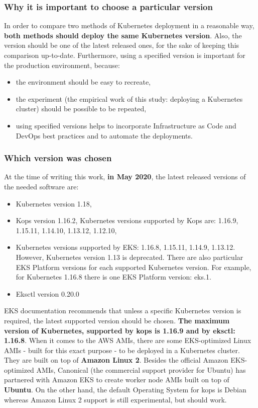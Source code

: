 \subsubsection{Why it is important to choose a particular version}
In order to compare two methods of Kubernetes deployment in a reasonable way, \textbf{both methods should deploy the same Kubernetes version}. Also, the version should be one of the latest released ones, for the sake of keeping this comparison up-to-date. Furthermore, using a specified version is important for the production environment, because:
\begin{itemize}
\item the environment should be easy to recreate,
\item the experiment (the empirical work of this study: deploying a Kubernetes cluster) should be possible to be repeated,
\item using specified versions helps to incorporate Infrastructure as Code and DevOps best practices and to automate the deployments.
\end{itemize}

\subsubsection{Which version was chosen}
At the time of writing this work, \textbf{in May 2020}, the latest released versions of the needed software are:
\begin{itemize}
\item Kubernetes version 1.18\cite{online-k8s-blog-latest},
\item Kops version 1.16.2, Kubernetes versions supported by Kops are: 1.16.9, 1.15.11, 1.14.10, 1.13.12, 1.12.10\cite{online-kops-versions}\cite{kops-releases}\cite{online-kops-versions2},
\item Kubernetes versions supported by EKS: 1.16.8, 1.15.11, 1.14.9, 1.13.12. However, Kubernetes version 1.13 is deprecated\cite{online-eks-versions}. There are also particular EKS Platform versions for each supported Kubernetes version. For example, for Kubernetes 1.16.8 there is one EKS Platform version: eks.1\cite{online-eks-platform-versions}.
\item Eksctl version 0.20.0\cite{online-eksctl-versions}
\end{itemize}

EKS documentation recommends that unless a specific Kubernetes version is required, the latest supported version should be chosen\cite{online-eks-versions}. \textbf{The maximum version of Kubernetes, supported by kops is 1.16.9 and by eksctl: 1.16.8}. When it comes to the AWS AMIs, there are some EKS-optimized Linux AMIs - built for this exact purpose - to be deployed in a Kubernetes cluster. They are built on top of \textbf{Amazon Linux 2}\cite{eks-optimized-ami}. Besides the official Amazon EKS-optimized AMIs, Canonical (the commercial support provider for Ubuntu) has partnered with Amazon EKS to create worker node AMIs built on top of \textbf{Ubuntu}\cite{eks-ubu}. On the other hand, the default Operating System for kops is Debian whereas Amazon Linux 2 support is still experimental, but should work\cite{online-kops-img}.

